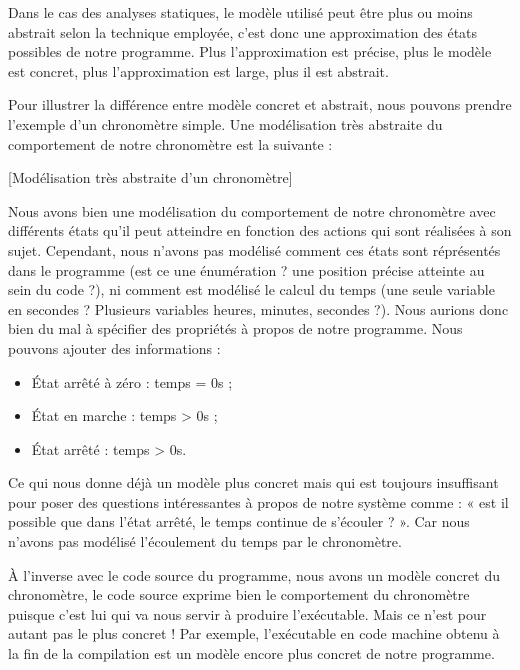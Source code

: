 Dans le cas des analyses statiques, le modèle utilisé peut être plus ou moins 
abstrait selon la technique employée, c'est donc une approximation des états 
possibles de notre programme. Plus l'approximation est précise, plus le modèle est
concret, plus l'approximation est large, plus il est abstrait.



Pour illustrer la différence entre modèle concret et abstrait, nous pouvons 
prendre l'exemple d'un chronomètre simple. Une modélisation très abstraite du
comportement de notre chronomètre est la suivante :


[Modélisation très abstraite d'un chronomètre]


Nous avons bien une modélisation du comportement de notre chronomètre avec 
différents états qu'il peut atteindre en fonction des actions qui sont réalisées
à son sujet. Cependant, nous n'avons pas modélisé comment ces états sont 
réprésentés dans le programme (est ce une énumération ? une position précise 
atteinte au sein du code ?), ni comment est modélisé le calcul du temps (une seule
variable en secondes ? Plusieurs variables heures, minutes, secondes ?). Nous 
aurions donc bien du mal à spécifier des propriétés à propos de notre programme. 
Nous pouvons ajouter des informations :



\begin{itemize}
\item État arrêté à zéro : temps = 0s ;
\item État en marche : temps > 0s ;
\item État arrêté : temps > 0s.
\end{itemize}


Ce qui nous donne déjà un modèle plus concret mais qui est toujours insuffisant 
pour poser des questions intéressantes à propos de notre système comme : « est il 
possible que dans l'état arrêté, le temps continue de s'écouler ? ». Car nous
n'avons pas modélisé l'écoulement du temps par le chronomètre.



À l'inverse avec le code source du programme, nous avons un modèle concret du
chronomètre, le code source exprime bien le comportement du chronomètre puisque
c'est lui qui va nous servir à produire l'exécutable. Mais ce n'est pour autant
pas le plus concret ! Par exemple, l'exécutable en code machine obtenu à la fin
de la compilation est un modèle encore plus concret de notre programme.



